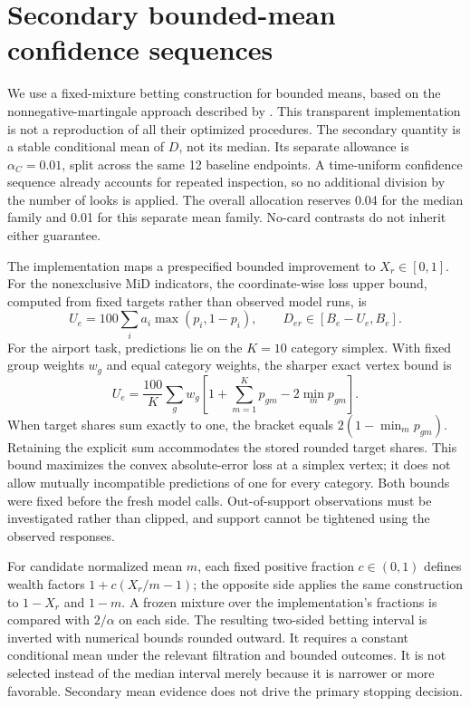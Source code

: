 \documentclass{article}
\begin{document}
\section{Secondary bounded-mean confidence sequences}
We use a fixed-mixture betting construction for bounded means, based on the nonnegative-martingale approach described by \citet{waudbysmith2024}. This transparent implementation is not a reproduction of all their optimized procedures.
The secondary quantity is a stable conditional mean of $D$, not its median. Its separate allowance is $\alpha_C=0.01$, split across the same 12 baseline endpoints. A time-uniform confidence sequence already accounts for repeated inspection, so no additional division by the number of looks is applied. The overall allocation reserves 0.04 for the median family and 0.01 for this separate mean family. No-card contrasts do not inherit either guarantee.

The implementation maps a prespecified bounded improvement to $X_r\in[0,1]$. For the nonexclusive MiD indicators, the coordinate-wise loss upper bound, computed from fixed targets rather than observed model runs, is
\begin{equation}
U_e=100\sum_i a_i\max(p_i,1-p_i),\qquad D_{er}\in[B_e-U_e,B_e].
\end{equation}
For the airport task, predictions lie on the $K=10$ category simplex. With fixed group weights $w_g$ and equal category weights, the sharper exact vertex bound is
\begin{equation}
U_e=\frac{100}{K}\sum_g w_g\left[1+\sum_{m=1}^{K}p_{gm}-2\min_m p_{gm}\right].
\end{equation}
When target shares sum exactly to one, the bracket equals $2(1-\min_m p_{gm})$. Retaining the explicit sum accommodates the stored rounded target shares. This bound maximizes the convex absolute-error loss at a simplex vertex; it does not allow mutually incompatible predictions of one for every category. Both bounds were fixed before the fresh model calls. Out-of-support observations must be investigated rather than clipped, and support cannot be tightened using the observed responses.

For candidate normalized mean $m$, each fixed positive fraction $c\in(0,1)$ defines wealth factors $1+c(X_r/m-1)$; the opposite side applies the same construction to $1-X_r$ and $1-m$. A frozen mixture over the implementation's fractions is compared with $2/\alpha$ on each side. The resulting two-sided betting interval is inverted with numerical bounds rounded outward. It requires a constant conditional mean under the relevant filtration and bounded outcomes. It is not selected instead of the median interval merely because it is narrower or more favorable. Secondary mean evidence does not drive the primary stopping decision.
\end{document}
